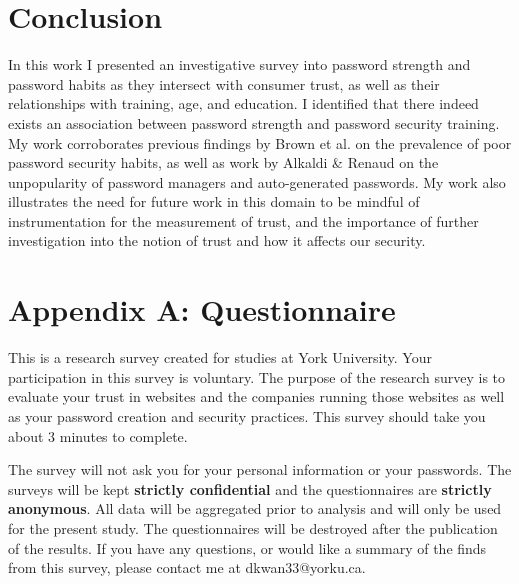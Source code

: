\documentclass[letterpaper, 10 pt, conference]{ieeeconf}  %
\begin{document}
\section{Conclusion}

In this work I presented an investigative survey into password strength and password habits as they intersect with consumer trust, as well as their relationships with training, age, and education. I identified that there indeed exists an association between password strength and password security training. My work corroborates previous findings by Brown et al. \cite{Brown2004} on the prevalence of poor password security habits, as well as work by Alkaldi \& Renaud \cite{Alkaldi2016} on the unpopularity of password managers and auto-generated passwords. My work also illustrates the need for future work in this domain to be mindful of instrumentation for the measurement of trust, and the importance of further investigation into the notion of trust and how it affects our security.










\section*{Appendix A: Questionnaire}

This is a research survey created for studies at York University. Your participation in this survey is voluntary. The purpose of the research survey is to evaluate your trust in websites and the companies running those websites as well as your password creation and security practices. This survey should take you about 3 minutes to complete.

The survey will not ask you for your personal information or your passwords. The surveys will be kept \textbf{strictly confidential} and the questionnaires are \textbf{strictly anonymous}. All data will be aggregated prior to analysis and will only be used for the present study. The questionnaires will be destroyed after the publication of the results. If you have any questions, or would like a summary of the finds from this survey, please contact me at dkwan33@yorku.ca.
\end{document}

